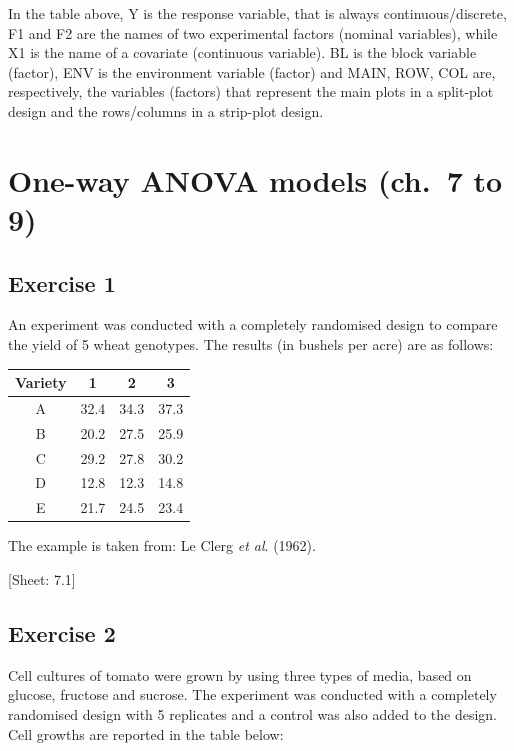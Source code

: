 \documentclass[a4paper,12pt,oneside]{book}
\begin{document}
In the table above, Y is the response variable, that is always continuous/discrete, F1 and F2 are the names of two experimental factors (nominal variables), while X1 is the name of a covariate (continuous variable). BL is the block variable (factor), ENV is the environment variable (factor) and MAIN, ROW, COL are, respectively, the variables (factors) that represent the main plots in a split-plot design and the rows/columns in a strip-plot design.

\hypertarget{one-way-anova-models-ch.-7-to-9}{%
\section{One-way ANOVA models (ch.~7 to 9)}\label{one-way-anova-models-ch.-7-to-9}}

\hypertarget{exercise-1-5}{%
\subsection{Exercise 1}\label{exercise-1-5}}

An experiment was conducted with a completely randomised design to compare the yield of 5 wheat genotypes. The results (in bushels per acre) are as follows:

\begin{longtable}[]{@{}cccc@{}}
\toprule()
Variety & 1 & 2 & 3 \\
\midrule()
\endhead
A & 32.4 & 34.3 & 37.3 \\
B & 20.2 & 27.5 & 25.9 \\
C & 29.2 & 27.8 & 30.2 \\
D & 12.8 & 12.3 & 14.8 \\
E & 21.7 & 24.5 & 23.4 \\
\bottomrule()
\end{longtable}

The example is taken from: Le Clerg \emph{et al}. (1962).

{[}Sheet: 7.1{]}

\hypertarget{exercise-2-5}{%
\subsection{Exercise 2}\label{exercise-2-5}}

Cell cultures of tomato were grown by using three types of media, based on glucose, fructose and sucrose. The experiment was conducted with a completely randomised design with 5 replicates and a control was also added to the design. Cell growths are reported in the table below:
\end{document}
